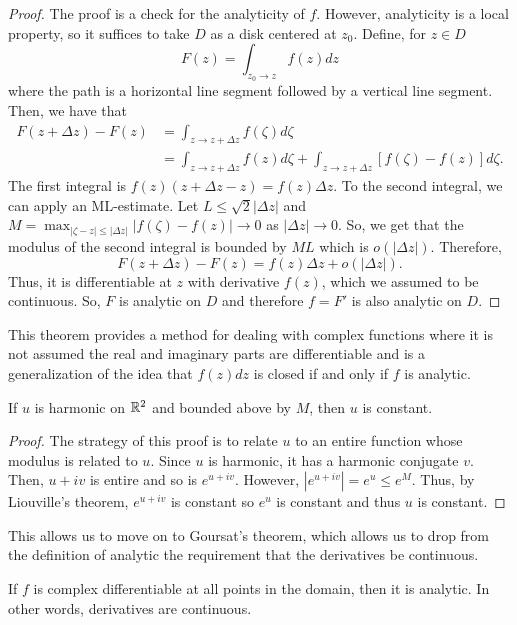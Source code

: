 \documentclass[11pt,leqno,oneside]{amsart}
\numberwithin{thm}{section}
\begin{document}
  \begin{proof}
    The proof is a check for the analyticity of $f$. However,
    analyticity is a local property, so it suffices to take $D$ as a
    disk centered at $z_0$. Define, for $z \in D$ \[
      F(z) = \int_{z_0 \to z} f(z)dz
    \]
    where the path is a horizontal line segment followed by a vertical
    line segment. Then, we have that
    \begin{align*}
      F(z+\Delta z) - F(z) & = \int_{z \to z+ \Delta z} f(\zeta)
                             d\zeta \\
      \ & = \int_{z \to z+\Delta z} f(z)d\zeta + \int_{z \to z +
          \Delta z} [f(\zeta) - f(z)]d\zeta.
    \end{align*}
    The first integral is $f(z)(z+\Delta z - z) = f(z) \Delta z$. To the
    second integral, we can apply an ML-estimate. Let $L \leq \sqrt{2}
    | \Delta z|$ and $M = \max_{|\zeta - z| \leq |\Delta z|} | f(\zeta) - f(z)| \to 0$ as $|\Delta
    z| \to 0$. So, we get
    that the modulus of the second integral is bounded by $ML$ which
    is $o(|\Delta z|)$. Therefore, \[
      F(z+\Delta z) - F(z) = f(z) \Delta z + o(|\Delta z|).
    \]
    Thus, it is differentiable at $z$ with derivative $f(z)$, which we
    assumed to be continuous. So, $F$ is analytic on $D$ and therefore
    $f = F'$ is also analytic on $D$.
  \end{proof}
  This theorem provides a method for dealing with complex functions
  where it is not assumed the real and imaginary parts are
  differentiable and is a generalization of the idea that $f(z)dz$ is
  closed if and only if $f$ is analytic.
  \begin{thm}
    If $u$ is harmonic on ${\mathbb R}^2$ and bounded above by $M$, then $u$ is
    constant.
  \end{thm}
  \begin{proof}
    The strategy of this proof is to relate $u$ to an entire function
    whose modulus is related to $u$. Since $u$ is harmonic, it has a
    harmonic conjugate $v$. Then, $u+iv$ is entire and so is
    $e^{u+iv}$. However, $|e^{u+iv}| = e^u \leq e^M$. Thus, by
    Liouville's theorem, $e^{u+iv}$ is constant so $e^u$ is constant
    and thus $u$ is constant.
  \end{proof}
  This allows us to move on to Goursat's theorem, which allows us to
  drop from the definition of analytic the requirement that the
  derivatives be continuous.
  \begin{thm}
    If $f$ is complex differentiable at all points in the domain, then
    it is analytic. In other words, derivatives are continuous.
  \end{thm}
\end{document}

